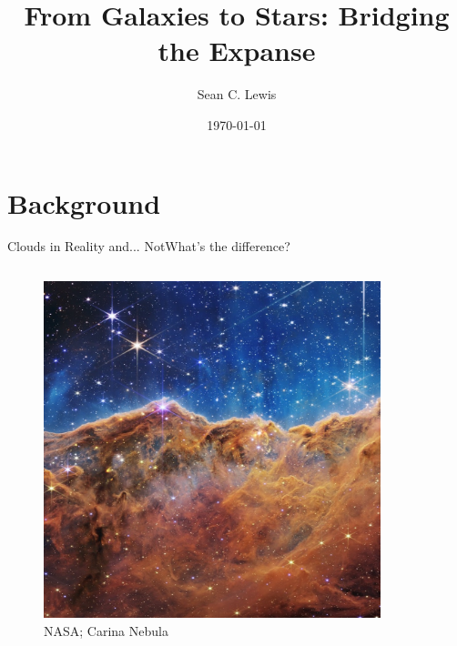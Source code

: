 \documentclass[aspectratio=169]{beamer}
\author{Sean C. Lewis}
\title{From Galaxies to Stars: Bridging the Expanse}
\date{\today}
\begin{document}
\titlepage

\section{Background}
%
\begin{frame}{Clouds in Reality and... Not}{What's the difference?}
    \begin{columns}
        \begin{column}{0.35\textwidth}
            \begin{figure}[h!]
                \centering
                \includegraphics[width=\linewidth]{../images/jwst.jpg} \\
                NASA; Carina Nebula
                \label{fig:jwst}
            \end{figure}
        \end{column}
        \begin{column}{0.35\textwidth}
            \begin{figure}[h!]
                \centering

\end{figure}
\end{column}
\end{columns}
\end{frame}
\end{document}
